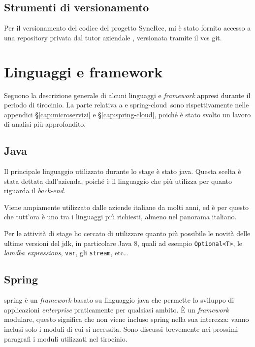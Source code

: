 \subsection{Strumenti di versionamento}

Per il versionamento del codice del progetto SyncRec, mi è stato fornito accesso a una \gls{repository} privata dal tutor aziendale \fabio, versionata tramite il \gls{vcs} \gls{git}.

\section{Linguaggi e framework}

Seguono la descrizione generale di alcuni linguaggi e \textit{framework} appresi durante il periodo di tirocinio.
La parte relativa a  e \gls{spring-cloud}\gloss\ sono rispettivamente nelle appendici \S\ref{cap:microservizi} e \S\ref{cap:spring-cloud}, poiché è stato svolto un lavoro di analisi più approfondito.

\subsection{Java} Il principale linguaggio utilizzato durante lo stage è stato \gls{java}. Questa scelta è stata dettata dall'azienda, poiché è il linguaggio che più utilizza per quanto riguarda il \textit{back-end}.

Viene ampiamente utilizzato dalle aziende italiane da molti anni, ed è per questo che tutt'ora è uno tra i linguaggi più richiesti, almeno nel panorama italiano.

Per le attività di stage ho cercato di utilizzare quanto più possibile le novità delle ultime versioni del \gls{jdk}, in particolare Java 8, quali ad esempio \texttt{Optional<T>}, le \textit{lamdba expressions}, \texttt{var}, gli \texttt{stream}, etc\dots

\subsection{Spring}

\gls{spring} è un \textit{framework} basato su linguaggio \gls{java} che permette lo sviluppo di applicazioni \textit{enterprise} praticamente per qualsiasi ambito.
È un \textit{framework} modulare, questo significa che non viene incluso \gls{spring} nella sua interezza: vanno inclusi solo i moduli di cui si necessita. Sono discussi brevemente nei prossimi paragrafi i moduli utilizzati nel tirocinio.

